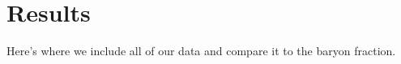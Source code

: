 \chapter{Results}
\label{chap:Results}
Here's where we include all of our data and compare it to the baryon
fraction.
